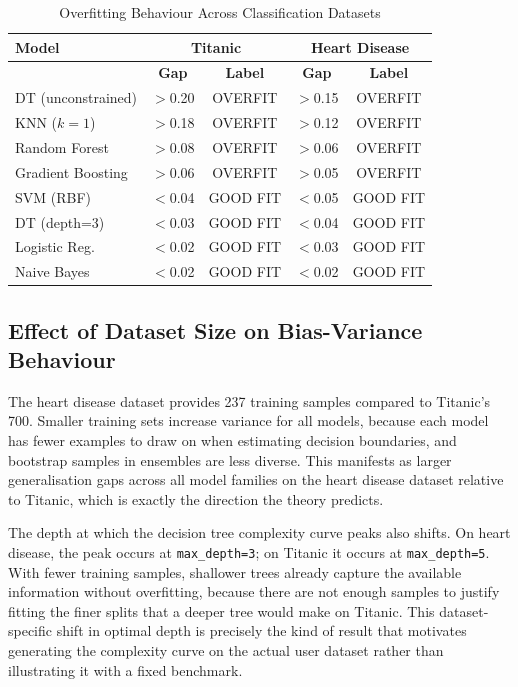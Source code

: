 \documentclass[conference]{IEEEtran}
\begin{document}
\begin{table}[t]
    \caption{Overfitting Behaviour Across Classification Datasets}
    \label{tab:crossdataset}
    \centering
    \small
    \renewcommand{\arraystretch}{1.3}
    \begin{tabular}{|>{\raggedright\arraybackslash}p{1.1in}|c|c|c|c|}
    \hline
    \textbf{Model} & \multicolumn{2}{c|}{\textbf{Titanic}} & \multicolumn{2}{c|}{\textbf{Heart Disease}} \\
    \cline{2-5}
     & \textbf{Gap} & \textbf{Label} & \textbf{Gap} & \textbf{Label} \\
    \hline
    DT (unconstrained) & $>$0.20 & OVERFIT & $>$0.15 & OVERFIT \\
    \hline
    KNN ($k=1$)        & $>$0.18 & OVERFIT & $>$0.12 & OVERFIT \\
    \hline
    Random Forest      & $>$0.08 & OVERFIT & $>$0.06 & OVERFIT \\
    \hline
    Gradient Boosting  & $>$0.06 & OVERFIT & $>$0.05 & OVERFIT \\
    \hline
    SVM (RBF)          & $<$0.04 & GOOD FIT & $<$0.05 & GOOD FIT \\
    \hline
    DT (depth=3)       & $<$0.03 & GOOD FIT & $<$0.04 & GOOD FIT \\
    \hline
    Logistic Reg.      & $<$0.02 & GOOD FIT & $<$0.03 & GOOD FIT \\
    \hline
    Naive Bayes        & $<$0.02 & GOOD FIT & $<$0.02 & GOOD FIT \\
    \hline
    \end{tabular}
\end{table}

\subsection{Effect of Dataset Size on Bias-Variance Behaviour}

The heart disease dataset provides 237 training samples compared to Titanic's 700. Smaller training sets increase variance for all models, because each model has fewer examples to draw on when estimating decision boundaries, and bootstrap samples in ensembles are less diverse. This manifests as larger generalisation gaps across all model families on the heart disease dataset relative to Titanic, which is exactly the direction the theory predicts.

The depth at which the decision tree complexity curve peaks also shifts. On heart disease, the peak occurs at \texttt{max\_depth=3}; on Titanic it occurs at \texttt{max\_depth=5}. With fewer training samples, shallower trees already capture the available information without overfitting, because there are not enough samples to justify fitting the finer splits that a deeper tree would make on Titanic. This dataset-specific shift in optimal depth is precisely the kind of result that motivates generating the complexity curve on the actual user dataset rather than illustrating it with a fixed benchmark.
\end{document}

